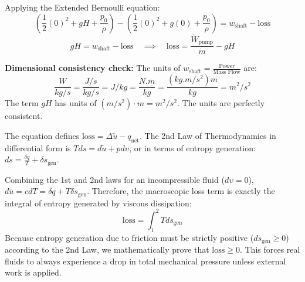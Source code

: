 Applying the Extended Bernoulli equation:
\begin{equation}
    \left( \frac{1}{2}(0)^2 + gH + \frac{p_0}{\rho} \right) - \left( \frac{1}{2}(0)^2 + g(0) + \frac{p_0}{\rho} \right) = w_{\text{shaft}} - \text{loss}
\end{equation}
\begin{equation}
    gH = w_{\text{shaft}} - \text{loss} \quad \implies \quad \text{loss} = \frac{\dot{W}_{\text{pump}}}{\dot{m}} - gH
\end{equation}

\textbf{Dimensional consistency check:}
The units of $w_{\text{shaft}} = \frac{\text{Power}}{\text{Mass Flow}}$ are:
\begin{equation}
    \frac{\si{W}}{\si{kg/s}} = \frac{\si{J/s}}{\si{kg/s}} = \si{J/kg} = \frac{\si{N.m}}{\si{kg}} = \frac{(\si{kg.m/s^2})\si{m}}{\si{kg}} = \si{m^2/s^2}
\end{equation}
The term $gH$ has units of $(\si{m/s^2}) \cdot \si{m} = \si{m^2/s^2}$. The units are perfectly consistent.

\begin{expertbox}
The equation defines $\text{loss} = \Delta \tilde{u} - q_{\text{net}}$. The 2nd Law of Thermodynamics in differential form is $T ds = d\tilde{u} + p d\upsilon$, or in terms of entropy generation: $ds = \frac{\delta q}{T} + \delta s_{\text{gen}}$. 

Combining the 1st and 2nd laws for an incompressible fluid ($d\upsilon = 0$), $d\tilde{u} = c dT = \delta q + T \delta s_{\text{gen}}$. Therefore, the macroscopic loss term is exactly the integral of entropy generated by viscous dissipation:
\begin{equation}
    \text{loss} = \int_{1}^{2} T ds_{\text{gen}}
\end{equation}
Because entropy generation due to friction must be strictly positive ($ds_{\text{gen}} \geq 0$) according to the 2nd Law, we mathematically prove that $\text{loss} \geq 0$. This forces real fluids to always experience a drop in total mechanical pressure unless external work is applied.
\end{expertbox}